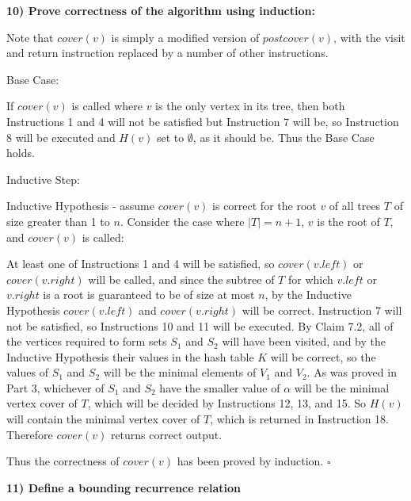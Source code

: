 \documentclass{article}
\begin{document}
\textbf{10) Prove correctness of the algorithm using induction:}

Note that $cover(v)$ is simply a modified version of $postcover(v)$, with the
visit and return instruction replaced by a number of other instructions.

Base Case:

If $cover(v)$ is called where $v$ is the only vertex in its tree, then both
Instructions 1 and 4 will not be satisfied but Instruction 7 will be, so
Instruction 8 will be executed and $H(v)$ set to $\emptyset$, as it should be.
Thus the Base Case holds.

Inductive Step:

Inductive Hypothesis - assume $cover(v)$ is correct for the root $v$ of all
trees $T$ of size greater than 1 to $n$. Consider the case where $|T|=n+1$, $v$
is the root of $T$, and $cover(v)$ is called:

At least one of Instructions 1 and 4 will be satisfied, so $cover(v.left)$
or $cover(v.right)$ will be called, and since the subtree of $T$ for which
$v.left$ or $v.right$ is a root is guaranteed to be of size at most $n$, by the
Inductive Hypothesis $cover(v.left)$ and $cover(v.right)$ will be correct.
Instruction 7 will not be satisfied, so Instructions 10 and 11 will be executed.
By Claim 7.2, all of the vertices
required to form sets $S_1$ and $S_2$ will have been visited, and by the
Inductive Hypothesis their values in the hash table $K$ will be correct, so
the values of $S_1$ and $S_2$ will be the minimal elements of $V_1$ and $V_2$.
As
was proved in Part 3, whichever of $S_1$ and $S_2$ have the smaller value of
$\alpha$ will be the minimal vertex cover of $T$, which will be decided by
Instructions 12, 13, and 15. So $H(v)$ will contain the minimal vertex cover of
$T$, which is returned in Instruction 18. Therefore $cover(v)$ returns correct
output.

Thus the correctness of $cover(v)$ has been proved by induction. $\square$

\textbf{11) Define a bounding recurrence relation}
\end{document}
